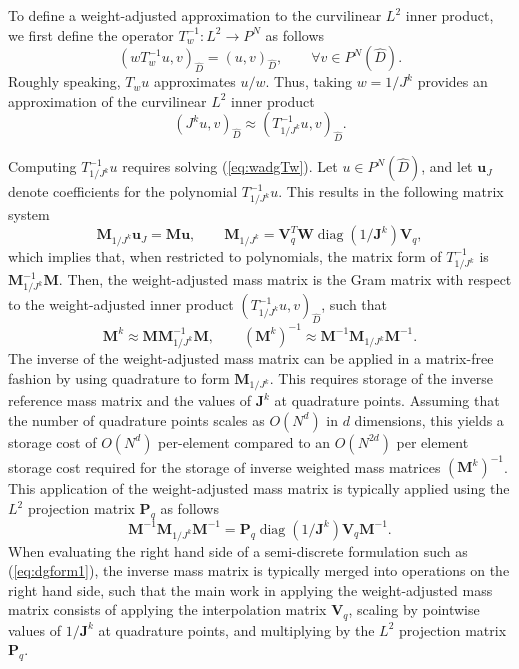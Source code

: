 \documentclass[preprint,10pt]{article}
\theoremstyle{definition}
\theoremstyle{lemma}
\theoremstyle{theorem}
\theoremstyle{assumption}
\DeclareMathOperator{\diag}{diag}
\renewcommand{\hat}{\widehat}
\newcommand{\LRp}[1]{\left( #1 \right)}
\begin{document}
{To define a weight-adjusted approximation to the curvilinear $L^2$ inner product, we first define the operator $T_{w}^{-1}: L^2\rightarrow P^N$ as follows
\begin{equation}
  \LRp{wT_{w}^{-1} u,v}_{\hat{D}} = \LRp{ u,v}_{\hat{D}}, \qquad \forall v\in P^N\LRp{\hat{D}}.
\label{eq:wadgTw}
\end{equation}
Roughly speaking, $T_{w} u$ approximates $u/w$.  Thus, taking $w = 1/J^k$ provides an approximation of the curvilinear $L^2$ inner product
\begin{equation*}
\LRp{J^k u,v}_{\hat{D}} \approx \LRp{T_{1/J^k}^{-1} u,v}_{\hat{D}}.
\end{equation*}

Computing $T_{1/J^k}^{-1}u$ requires solving (\ref{eq:wadgTw}).  Let $u \in P^N\LRp{\hat{D}}$, and let $\bm{u}_J$ denote coefficients for the polynomial $T_{1/J^k}^{-1}u$.  This results in the following matrix system
\[
\bm{M}_{1/J^k}\bm{u}_{J} = \bm{M}\bm{u}, \qquad {\bm{M}_{1/J^k}} = \bm{V}_q^T \bm{W}\diag\LRp{1/\bm{J}^k}\bm{V}_q,%
\]
which implies that, when restricted to polynomials, the matrix form of $T_{1/J^k}^{-1}$ is $\bm{M}_{1/J^k}^{-1}\bm{M}$.  Then, the weight-adjusted mass matrix is the Gram matrix with respect to the weight-adjusted inner product $\LRp{T_{1/J^k}^{-1} u,v}_{\hat{D}}$, such that
\[
\bm{M}^k \approx \bm{M}\bm{M}_{1/J^k}^{-1}\bm{M}, \qquad \LRp{\bm{M}^k}^{-1} \approx \bm{M}^{-1}\bm{M}_{1/J^k}\bm{M}^{-1}.
\]
The inverse of the weight-adjusted mass matrix can be applied in a matrix-free fashion by using quadrature to form $\bm{M}_{1/J^k} $.  This requires storage of the inverse reference mass matrix and the values of $\bm{J}^k$ at quadrature points.  Assuming that the number of quadrature points scales as $O(N^d)$ in $d$ dimensions, this yields a storage cost of $O(N^d)$ per-element compared to an $O(N^{2d})$ per element storage cost required for the storage of inverse weighted mass matrices $\LRp{\bm{M}^k}^{-1}$.  This application of the weight-adjusted mass matrix is typically applied using the $L^2$ projection matrix $\bm{P}_q$ as follows
\[
\bm{M}^{-1}\bm{M}_{1/J^k}\bm{M}^{-1} = \bm{P}_q \diag\LRp{1/\bm{J}^k} \bm{V}_q \bm{M}^{-1}.
\]
When evaluating the right hand side of a semi-discrete formulation such as (\ref{eq:dgform1}), the inverse mass matrix is typically merged into operations on the right hand side, such that the main work in applying the weight-adjusted mass matrix consists of applying the interpolation matrix $\bm{V}_q$, scaling by pointwise values of $1/\bm{J}^k$ at quadrature points, and multiplying by the $L^2$ projection matrix $\bm{P}_q$.


}
\end{document}
